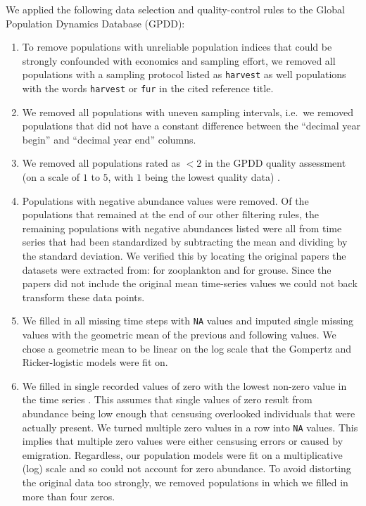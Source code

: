 \documentclass[12pt]{article}
\begin{document}
We applied the following data selection and quality-control rules to the
Global Population Dynamics Database (GPDD):

\begin{enumerate}

\item To remove populations with unreliable population indices that could be
  strongly confounded with economics and sampling effort, we removed all
  populations with a sampling protocol listed as \texttt{harvest} as well
  populations with the words \texttt{harvest} or \texttt{fur} in the cited
  reference title.

\item We removed all populations with uneven sampling intervals, i.e.\ we
  removed populations that did not have a constant difference between the
  ``decimal year begin'' and ``decimal year end'' columns.

\item We removed all populations rated as $< 2$ in the GPDD quality assessment
  (on a scale of $1$ to $5$, with $1$ being the lowest quality data)
  \cite{sibly2005, ziebarth2010}.

\item Populations with negative abundance values were removed. Of the
  populations that remained at the end of our other filtering rules, the
  remaining populations with negative abundances listed were all from time
  series that had been standardized by subtracting the mean and dividing by the
  standard deviation. We verified this by locating the original papers the
  datasets were extracted from: \cite{colebrook1978} for zooplankton and
  \cite{lindstrom1995} for grouse. Since the papers did not include the
  original mean time-series values we could not back transform these data
  points.

\item We filled in all missing time steps with \texttt{NA} values and imputed
  single missing values with the geometric mean of the previous and following
  values. We chose a geometric mean to be linear on the log scale that the
  Gompertz and Ricker-logistic models were fit on.

\item We filled in single recorded values of zero with the lowest non-zero
  value in the time series \cite{brook2006a}. This assumes that
  single values of zero result from abundance being low enough that censusing
  overlooked individuals that were actually present. We turned multiple zero
  values in a row into \texttt{NA} values. This implies that multiple zero
  values were either censusing errors or caused by emigration. Regardless, our
  population models were fit on a multiplicative (log) scale and so could not
  account for zero abundance. To avoid distorting the original data too
  strongly, we removed populations in which we filled in more than four zeros.


\end{enumerate}
\end{document}
